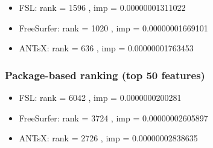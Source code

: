 \documentclass[
  10pt,
]{article}
\begin{document}
\begin{itemize}
\item
  FSL: rank = 1596 , imp = 0.00000001311022
\item
  FreeSurfer: rank = 1020 , imp = 0.00000001669101
\item
  ANTsX: rank = 636 , imp = 0.00000001763453
\end{itemize}

\hypertarget{package-based-ranking-top-50-features-11}{%
\subsubsection{Package-based ranking (top 50
features)}\label{package-based-ranking-top-50-features-11}}

\begin{itemize}
\item
  FSL: rank = 6042 , imp = 0.0000000200281
\item
  FreeSurfer: rank = 3724 , imp = 0.00000002605897
\item
  ANTsX: rank = 2726 , imp = 0.00000002838635
\end{itemize}

\clearpage
\end{document}
